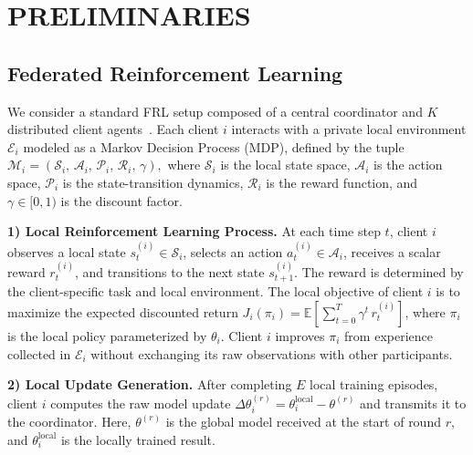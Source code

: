 \documentclass[journal]{IEEEtran}
\begin{document}
\section{PRELIMINARIES}\label{sec:preliminaries}

\subsection{Federated Reinforcement Learning}

We consider a standard FRL setup composed of a central coordinator and $K$
distributed client agents~\cite{qi2021federated}. Each client $i$ interacts with a private local
environment $\mathcal{E}_i$ modeled as a Markov Decision Process (MDP),
defined by the tuple
$ \mathcal{M}_i = (\mathcal{S}_i,\, \mathcal{A}_i,\, \mathcal{P}_i,\,
  \mathcal{R}_i,\, \gamma),
$
where $\mathcal{S}_i$ is the local state space, $\mathcal{A}_i$ is the action
space, $\mathcal{P}_i$ is the state-transition dynamics, $\mathcal{R}_i$ is the
reward function, and $\gamma \in [0,1)$ is the discount factor.

\textbf{1) Local Reinforcement Learning Process.}
At each time step $t$, client $i$ observes a local state
$s_t^{(i)} \in \mathcal{S}_i$, selects an action
$a_t^{(i)} \in \mathcal{A}_i$, receives a scalar reward $r_t^{(i)}$, and
transitions to the next state $s_{t+1}^{(i)}$.
The reward is determined by the client-specific task and local environment.
The local objective of client $i$ is to maximize the expected discounted return
$J_i(\pi_i) = \mathbb{E}\!\left[\sum_{t=0}^{T} \gamma^t\, r_t^{(i)}\right]$,
where $\pi_i$ is the local policy parameterized by $\theta_i$.
Client $i$ improves $\pi_i$ from experience collected in $\mathcal{E}_i$
without exchanging its raw observations with other participants.

\textbf{2) Local Update Generation.}
After completing $E$ local training episodes, client $i$ computes the raw
model update $\Delta\theta_i^{(r)} = \theta_i^{\mathrm{local}} - \theta^{(r)}$ and transmits
it to the coordinator. Here, $\theta^{(r)}$ is the global model received at the start of round $r$,
and $\theta_i^{\mathrm{local}}$ is the locally trained result.
\end{document}
